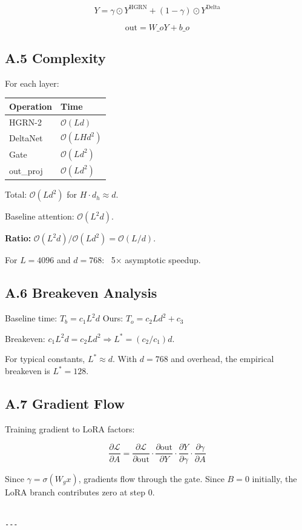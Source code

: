 \[
Y = \gamma \odot Y^\text{HGRN} + (1 - \gamma) \odot Y^\text{Delta}
\tag{A.6}
\]

\[
\text{out} = W\_o Y + b\_o
\tag{A.7}
\]

\subsection{A.5 Complexity}

For each layer:

\begin{table}[H]
\centering
\small
\begin{tabular}{ll}
\toprule
\textbf{Operation} & \textbf{Time} \\
\midrule
HGRN-2 & $\mathcal{O}(L d)$ \\
DeltaNet & $\mathcal{O}(L H d^2)$ \\
Gate & $\mathcal{O}(L d^2)$ \\
out\_proj & $\mathcal{O}(L d^2)$ \\
\bottomrule
\end{tabular}
\end{table}

Total: $\mathcal{O}(L d^2)$ for $H \cdot d_h \approx d$.

Baseline attention: $\mathcal{O}(L^2 d)$.

\textbf{Ratio:} $\mathcal{O}(L^2 d) / \mathcal{O}(L d^2) = \mathcal{O}(L/d)$.

For $L = 4096$ and $d = 768$: ~5$\times$ asymptotic speedup.

\subsection{A.6 Breakeven Analysis}

Baseline time: $T_b = c_1 L^2 d$
Ours: $T_o = c_2 L d^2 + c_3$

Breakeven: $c_1 L^2 d = c_2 L d^2 \Rightarrow L^* = (c_2/c_1) d$.

For typical constants, $L^* \approx d$. With $d = 768$ and overhead, the 
empirical breakeven is $L^* = 128$.

\subsection{A.7 Gradient Flow}

Training gradient to LoRA factors:

\[
\frac{\partial \mathcal{L}}{\partial A} = \frac{\partial \mathcal{L}}{\partial \text{out}} \cdot \frac{\partial \text{out}}{\partial Y} \cdot \frac{\partial Y}{\partial \gamma} \cdot \frac{\partial \gamma}{\partial A}
\tag{A.8}
\]

Since $\gamma = \sigma(W_g x)$, gradients flow through the gate. Since 
$B = 0$ initially, the LoRA branch contributes zero at step 0.
\begin{lstlisting}

---
\end{lstlisting}